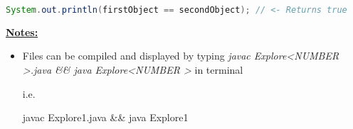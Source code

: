 \documentclass[12pt]{article}
\begin{document}
\begin{itemize}
\begin{lstlisting}[language=Java, caption={lesson\_01/Explore4.java}]
    System.out.println(firstObject == secondObject); // <- Returns true
    \end{lstlisting}

    \bigskip

    \underline{\textbf{Notes:}}

    \bigskip

    \begin{itemize}
        \item Files can be compiled and displayed by typing \textit{javac Explore\textless NUMBER \textgreater.java \&\& java Explore\textless NUMBER \textgreater}
        in terminal

        \bigskip

        i.e.

        javac Explore1.java \&\& java Explore1

    \end{itemize}
\end{itemize}
\end{document}
